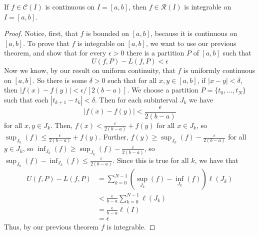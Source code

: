 \begin{theorem}
    If $f \in \mathcal{C}(I)$ is continuous on $I=[a,b]$, then $f \in \mathcal{R}(I)$ is integrable on $I=[a,b]$.
\end{theorem}
\begin{proof}
    Notice, first, that $f$ is bounded on $[a,b]$, because it is continuous on $[a,b]$. To prove that $f$ is integrable on $[a,b]$, we want to use our previous theorem, and show that for every $\epsilon > 0$ there is a partition $P$ of $[a,b]$ such that \begin{equation*}
        U(f,P) - L(f,P) < \epsilon
    \end{equation*}
    Now we know, by our result on uniform continuity, that $f$ is uniformly continuous on $[a,b]$. So there is some $\delta > 0$ such that for all $x,y \in [a,b]$, if $|x-y| < \delta$, then $|f(x) - f(y)| < \epsilon/[2(b-a)]$. We choose a partition $P = \{t_0,...,t_N\}$ such that each $|t_{k+1}-t_{k}| < \delta$. Then for each subinterval $J_k$ we have \begin{equation*}
        |f(x) - f(y)| < \frac{\epsilon}{2(b-a)}
    \end{equation*}
    for all $x,y \in J_k$. Then, $f(x) < \frac{\epsilon}{2(b-a)}+f(y)$ for all $x\in J_k$, so $\sup_{J_k}(f) \leq \frac{\epsilon}{2(b-a)} + f(y)$. Further, $f(y) \geq \sup_{J_k}(f) - \frac{\varepsilon}{2(b-a)}$ for all $y \in J_k$, so $\inf_{J_k}(f) \geq \sup_{J_k}(f) - \frac{\varepsilon}{2(b-a)}$, so $\sup_{J_k}(f) - \inf_{J_k}(f) \leq \frac{\varepsilon}{2(b-a)}$. Since this is true for all $k$, we have that \begin{align*}
        U(f,P) - L(f,P) &= \sum_{k=0}^{N-1}(\sup_{J_k}(f) - \inf_{J_k}(f))\ell(J_k) \\
        &< \frac{\epsilon}{b-a}\sum_{k=0}^{N-1}\ell(J_k) \\
        &= \frac{\epsilon}{b-a}\ell(I) \\
        &= \epsilon
    \end{align*}
    Thus, by our previous theorem $f$ is integrable.
\end{proof}


